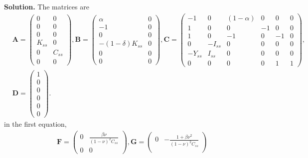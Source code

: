 \documentclass[11pt]{article}
\numberwithin{equation}{section} %
\numberwithin{figure}{section} %
\numberwithin{table}{section} %
\theoremstyle{definition}
\newenvironment{solution}{\begin{addmargin}[2em]{0em} {\bf Solution. }}{\end{addmargin}}
\begin{document}
\begin{solution}
    The matrices are
    \begin{align*}
        &\mathbf{A} = \begin{pmatrix}
            0 & 0 \\
            0 & 0 \\
            0 & 0 \\
            K_{ss} & 0 \\
            0 & C_{ss} \\
            0 & 0
        \end{pmatrix}, \mathbf{B} = \begin{pmatrix}
            \alpha & 0 \\
            -1 & 0 \\
            0 & 0 \\
            -(1-\delta) K_{ss} & 0 \\
            0 & 0 \\
            0 & 0
        \end{pmatrix}, \mathbf{C} = \begin{pmatrix}
            -1 & 0 & (1-\alpha) & 0 & 0 & 0 \\
            1 & 0 & 0 & -1 & 0 & 0 \\
            1 & 0 & -1 & 0 & -1 & 0 \\
            0 & -I_{ss} & 0 & 0 & 0 & 0 \\
            -Y_{ss} & I_{ss} & 0 & 0 & 0 & 0 \\
            0 & 0 & 0 & 0 & 1 & 1
        \end{pmatrix}, \\
        &\mathbf{D} = \begin{pmatrix}
            1 \\ 0 \\ 0 \\ 0 \\ 0 \\ 0
       \end{pmatrix}.
    \end{align*}
    in the first equation,
    \begin{align*}
        &\mathbf{F} = \begin{pmatrix}
            0 & \frac{\beta \nu}{(1 - \nu)^2 C_{ss}} \\
            0 & 0
        \end{pmatrix}, \mathbf{G} = \begin{pmatrix}
            0 & -\frac{1 + \beta \nu^2}{(1 - \nu)^2 C_{ss}} \\

\end{pmatrix}
\end{align*}
\end{solution}
\end{document}
